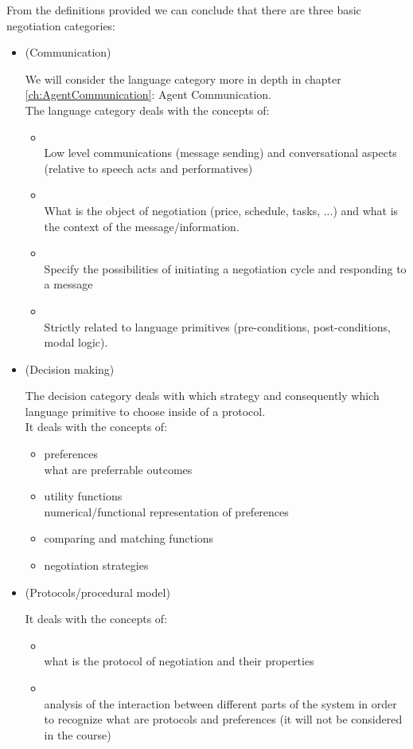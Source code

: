 From the definitions provided we can conclude that there are three basic negotiation categories:
\begin{itemize}
\item {} (Communication)

We will consider the language category more in depth in chapter \ref{ch:AgentCommunication}: Agent Communication.\\
The language category deals with the concepts of:
\begin{itemize}
\item {}\\
Low level communications (message sending) and conversational aspects (relative to speech acts and performatives)
\item {}\\
What is the object of negotiation (price, schedule, tasks, ...) and what is the context of the message/information.
\item {}\\
Specify the possibilities of initiating a negotiation cycle and responding to a message
\item {}\\
Strictly related to language primitives (pre-conditions, post-conditions, modal logic).
\end{itemize}

\item {} (Decision making)

The decision category deals with which strategy and consequently which language primitive to choose inside of a protocol.\\
It deals with the concepts of:
\begin{itemize}
\item preferences\\ 
what are preferrable outcomes
\item utility functions\\
 numerical/functional representation of preferences
\item comparing and matching functions
\item negotiation strategies
\end{itemize}

\item {} (Protocols/procedural model)

It deals with the concepts of:
\begin{itemize}
\item {}\\
what is the protocol of negotiation and their properties
\item {}\\
analysis of the interaction between different parts of the system in order to recognize what are protocols and preferences (it will not be considered in the course)
\end{itemize}
\end{itemize}
